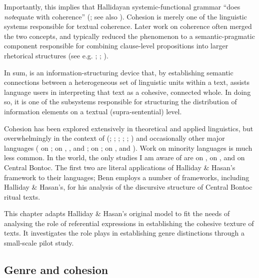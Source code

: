 \documentclass[output=paper
,modfonts
,nonflat]{langsci/langscibook}
\begin{document}
Importantly, this implies that Hallidayan systemic-functional grammar “does \textit{not}\linebreak equate  with coherence” (\citealt[27]{Martin1992}; see also \citealt{Martin2001}). Cohesion is merely one of the linguistic systems responsible for textual coherence. Later work on coherence often merged the two concepts, and typically reduced the phenomenon to a semantic-pragmatic component responsible for combining clause-level propositions into larger rhetorical structures (see e.g. \citealt{Mann1987}; \citealt{Kehler2002}; \citealt{Kehler2004}).

In sum,  is an information-structuring device that, by establishing semantic connections between a heterogeneous set of linguistic units within a text, assists language users in interpreting that text as a cohesive, connected whole. In doing so, it is one of the subsystems responsible for structuring the distribution of information elements on a textual (supra-sentential) level.

Cohesion has been explored extensively in theoretical and applied linguistics, but overwhelmingly in the context of  (\citealt{Halliday1976}; \citealt{Connor1984}; \citealt{Martin1992}; \citealt{Abadiano1995}; \citealt{Tanskanen2006}; \citealt{Crossley2012}) and occasionally other major languages (\citealt{Aziz1988} on ; \citealt{Hickmann1999} on , ,  and ; \citealt{Kruger2000} on ; \citealt{Hassel2005} on ,  and ). Work on minority languages is much less common. In the  world, the only studies I am aware of are \citet{Ezard1978} on , \citet{Flaming1983} on , and \citet{Benn1991} on Central Bontoc. The first two are literal applications of Halliday \& Hasan’s framework to their languages; Benn employs a number of frameworks, including Halliday \& Hasan’s, for his analysis of the discursive structure of Central Bontoc ritual texts.\largerpage[-1] 

This chapter adapts Halliday \& Hasan’s original model to fit the needs of analysing the role of referential expressions in establishing the cohesive texture of  texts. It investigates the role  plays in establishing genre distinctions through a small-scale pilot study.

\subsection{\label{s1.2}Genre and cohesion}
\end{document}
